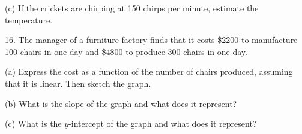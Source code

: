 \documentclass{sebase}
\begin{document}
\begin{multicols}{2}
\begin{ExerciseList}
\begin{ExerciseList}
\item[(c)] If the crickets are chirping at 150 chirps per minute, estimate
the temperature.

%
\end{ExerciseList}

%

\item[16.] The manager of a furniture factory finds that it costs \$2200 to
manufacture 100 chairs in one day and \$4800 to produce 300 chairs in one
day.\vspace{-2pt}

\begin{ExerciseList}
\item[(a)] Express the cost as a function of the number of chairs produced,
assuming that it is linear. Then sketch the graph.

%

\item[(b)] What is the slope of the graph and what does it represent?

%

\item[(c)] What is the $y$-intercept of the graph and what does it \newline
represent?

%
\end{ExerciseList}


\end{ExerciseList}
\end{multicols}
\end{document}
